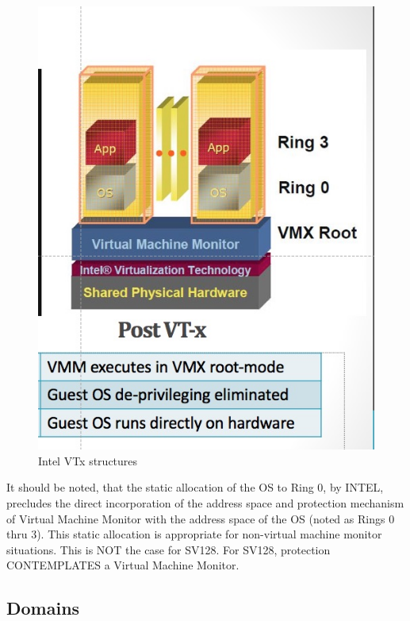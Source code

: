 \documentclass{article}
\begin{document}
\begin{figure}[h]
\begin{center}
\includegraphics[scale=.4]{figures/figure2a_intelvtx.jpg}
\caption{Intel VTx structures\label{fig:intelvtx}}
\end{center}
\end{figure}


It should be noted,  that the static allocation of the OS to Ring 0,  by INTEL, precludes the direct incorporation of the address space and protection mechanism of Virtual Machine Monitor with the address space of the OS (noted as Rings 0 thru 3). This static allocation is appropriate for non-virtual machine monitor situations.  This is NOT the case for SV128. For SV128,  protection CONTEMPLATES a Virtual Machine Monitor.
\pagebreak
\pagebreak

\subsection{Domains}
\end{document}
